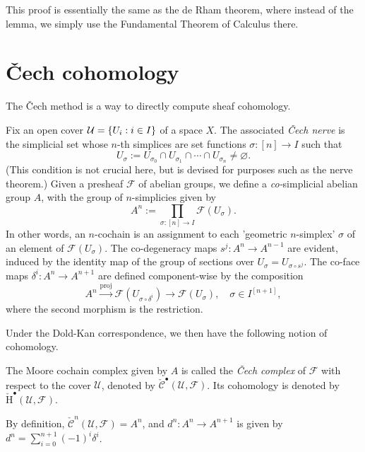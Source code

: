 \documentclass{article}
\newcommand{\Cech}{\v{C}ech}
\newcommand{\cC}{\check{\mathcal{C}}}
\newcommand{\cH}{\check{\mathrm{H}}}
\begin{document}
\begin{remark}
    This proof is essentially the same as the de Rham theorem, where instead of the lemma, we simply use the Fundamental Theorem of Calculus there. 
\end{remark}

\section{\Cech{} cohomology}

The \Cech{} method is a way to directly compute sheaf cohomology.

Fix an open cover $\mathcal{U}=\left\{U_i:i\in I\right\}$ of a space $X$. The associated \emph{\Cech{} nerve} is the simplicial set whose $n$-th simplices are set functions $\sigma:[n]\to I$ such that 
\[
    U_{\sigma}:=U_{\sigma_{0}}\cap U_{\sigma_{1}}\cap\cdots\cap U_{\sigma_{n}}\neq\varnothing.
\]
(This condition is not crucial here, but is devised for purposes such as the nerve theorem.) Given a presheaf $\mathcal{F}$ of abelian groups, we define a \emph{co-}simplicial abelian group $A$, with the group of $n$-simplicies given by
\[
    A^n := \prod_{\sigma:[n]\to I}\mathcal{F}(U_\sigma).
\]
In other words, an $n$-cochain is an assignment to each 'geometric $n$-simplex' $\sigma$ of an element of $\mathcal{F}(U_\sigma)$. The co-degeneracy maps $s^j:A^{n}\to A^{n-1}$ are evident, induced by the identity map of the group of sections over $U_{\sigma}=U_{\sigma\circ s^j}$. The co-face maps $\delta^i:A^{n}\to A^{n+1}$ are defined component-wise by the composition
\[
    A^{n} \xrightarrow{\text{proj}} \mathcal{F}(U_{\sigma\circ\delta^i}) \longrightarrow \mathcal{F}(U_{\sigma}),
    \quad \sigma\in I^{[n+1]},
\]
where the second morphism is the restriction.

Under the Dold-Kan correspondence, we then have the following notion of cohomology.
\begin{definition}
    The Moore cochain complex given by $A$ is called the \emph{\Cech{} complex} of $\mathcal{F}$ with respect to the cover $\mathcal{U}$, denoted by $\cC^{\bullet}(\mathcal{U},\mathcal{F})$. Its cohomology is denoted by $\cH^\bullet(\mathcal{U},\mathcal{F})$.
\end{definition}

By definition, $\cC^{n}(\mathcal{U},\mathcal{F})=A^n$, and $d^n:A^{n}\to A^{n+1}$ is given by $d^n = \sum_{i=0}^{n+1} (-1)^i\delta^i$.
\end{document}
